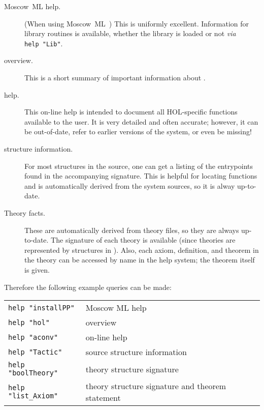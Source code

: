  \begin{description}

 \item [Moscow~ML help.]  (When using Moscow~ML~\HOL{})
   This is uniformly excellent.
   Information for library routines is available, whether the library is loaded or not \emph{via} \texttt{help~"Lib"}.

\item [\HOL{} overview.] This is a short summary of important information
  about \HOL{}.

\item [\HOL{} help.] This on-line help is intended to document all
  HOL-specific functions available to the user. It is very detailed
  and often accurate; however, it can be out-of-date, refer to earlier
  versions of the system, or even be missing!

\item [\HOL{} structure information.]  For most structures in the
  \HOL{} source, one can get a listing of the entrypoints found in the
  accompanying signature. This is helpful for locating functions and
  is automatically derived from the system sources, so it is alway
  up-to-date.

\item [Theory facts.] These are automatically derived from theory
  files, so they are always up-to-date. The signature of each theory
  is available (since theories are represented by structures in
  \HOL{}). Also, each axiom, definition, and theorem in the theory can
  be accessed by name in the help system; the theorem itself is given.
\end{description}

Therefore the following example queries can be made:

\begin{table}[h]
  \begin{center}
    \begin{tabular}{|l|l|} \hline
      \verb+help "installPP"+ & Moscow ML help \\
      \verb+help "hol"+ &  \HOL{} overview \\
      \verb+help "aconv"+ &  on-line \HOL{} help \\
      \verb+help "Tactic"+ & \HOL{} source structure information \\
      \verb+help "boolTheory"+ &  theory structure signature \\
      \verb+help "list_Axiom"+ & theory structure signature and theorem
      statement \\ \hline
    \end{tabular}
  \end{center}
\end{table}


